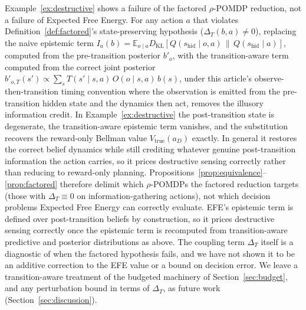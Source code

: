 \begin{remark}
\label{rem:transition-aware}
Example~\ref{ex:destructive} shows a failure of the factored $\rho$-POMDP reduction, not a failure of Expected Free Energy. For any action $a$ that violates Definition~\ref{def:factored}'s state-preserving hypothesis ($\Delta_T(b,a) \neq 0$), replacing the naive epistemic term $I_a(b) = \mathbb{E}_{o \mid a} D_{\mathrm{KL}}[Q(s_{\mathrm{hid}} \mid o, a) \,\|\, Q(s_{\mathrm{hid}} \mid a)]$, computed from the pre-transition posterior $b'_o$, with the transition-aware term computed from the correct joint posterior $b'_{o,T}(s') \propto \sum_{s} T(s' \mid s, a)\, O(o \mid s, a)\, b(s)$, under this article's observe-then-transition timing convention where the observation is emitted from the pre-transition hidden state and the dynamics then act, removes the illusory information credit. In Example~\ref{ex:destructive} the post-transition state is degenerate, the transition-aware epistemic term vanishes, and the substitution recovers the reward-only Bellman value $V_{\mathrm{true}}(a_D)$ exactly. In general it restores the correct belief dynamics while still crediting whatever genuine post-transition information the action carries, so it prices destructive sensing correctly rather than reducing to reward-only planning. Propositions~\ref{prop:equivalence}--\ref{prop:factored} therefore delimit which $\rho$-POMDPs the factored reduction targets (those with $\Delta_T \equiv 0$ on information-gathering actions), not which decision problems Expected Free Energy can correctly evaluate. EFE's epistemic term is defined over post-transition beliefs by construction, so it prices destructive sensing correctly once the epistemic term is recomputed from transition-aware predictive and posterior distributions as above. The coupling term $\Delta_T$ itself is a diagnostic of when the factored hypothesis fails, and we have not shown it to be an additive correction to the EFE value or a bound on decision error. We leave a transition-aware treatment of the budgeted machinery of Section~\ref{sec:budget}, and any perturbation bound in terms of $\Delta_T$, as future work (Section~\ref{sec:discussion}).
\end{remark}

